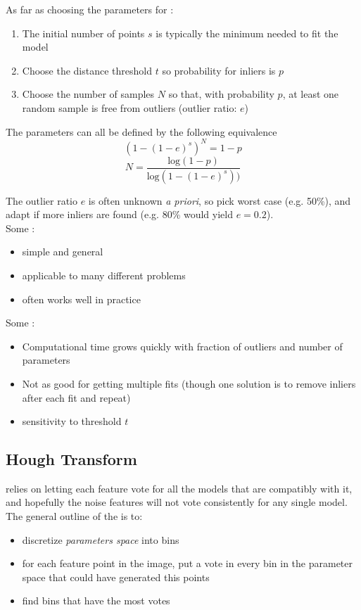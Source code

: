 \documentclass{article}
\begin{document}
As far as choosing the parameters for : 
\begin{enumerate}
  \item The initial number of points $s$ is typically the minimum needed to fit the model 
  \item Choose the distance threshold $t$ so probability for inliers is $p$ 
  \item Choose the number of samples $N$ so that, with probability $p$, at least one random sample is free from outliers (outlier ratio: $e$)
\end{enumerate}
The parameters can all be defined by the following equivalence $$(1-(1-e)^{s})^{N} = 1 - p$$ $$N = \frac{\textrm{log}(1-p)}{\textrm{log}(1-(1-e)^{s}))}$$

The outlier ratio $e$ is often unknown \emph{a priori}, so pick worst case (e.g. 50\%), and adapt if more inliers are found (e.g. 80\% would yield $e=0.2$). \\ 

Some :
\begin{itemize}
  \item simple and general 
  \item applicable to many different problems 
  \item often works well in practice 
\end{itemize}
Some :
\begin{itemize}
  \item Computational time grows quickly with fraction of outliers and number of parameters 
  \item Not as good for getting multiple fits (though one solution is to remove inliers after each fit and repeat)
  \item sensitivity to threshold $t$
\end{itemize}

\subsection{Hough Transform}

 relies on letting each feature vote for all the models that are compatibly with it, and hopefully the noise features will not vote consistently for any single model. The general outline of the  is to:
\begin{itemize}
  \item discretize \emph{parameters space} into bins 
  \item for each feature point in the image, put a vote in every bin in the parameter space that could have generated this points 
  \item find bins that have the most votes
\end{itemize}
\end{document}
